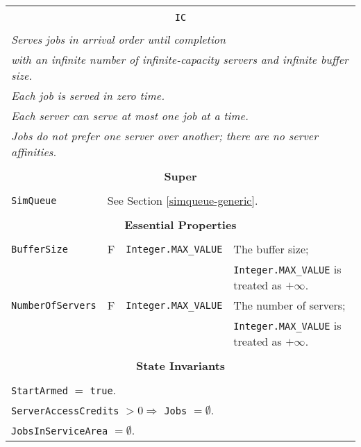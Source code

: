 \documentclass[12pt]{book}
\begin{document}
\begin{tabular}{|l|l|l|l|}
\hline
\multicolumn{4}{|c|}{} \\
\multicolumn{4}{|c|}{\lstinline[basicstyle=\large]{IC}} \\
\multicolumn{4}{|c|}{} \\
\hline
\multicolumn{4}{|l|}{\em Serves jobs in arrival order until completion} \\
\multicolumn{4}{|l|}{\em with an infinite number of infinite-capacity servers and infinite buffer size.} \\
\multicolumn{4}{|l|}{\em Each job is served in zero time.} \\
\multicolumn{4}{|l|}{\em Each server can serve at most one job at a time.} \\
\multicolumn{4}{|l|}{\em Jobs do not prefer one server over another; there are no server affinities.} \\
\hline
\multicolumn{4}{|c|}{} \\
\multicolumn{4}{|c|}{\bf Super} \\
\multicolumn{4}{|c|}{} \\
\hline
\lstinline|SimQueue| & \multicolumn{3}{|l|}{See Section \ref{simqueue-generic}.} \\
\hline
\multicolumn{4}{|c|}{} \\
\multicolumn{4}{|c|}{\bf Essential Properties} \\
\multicolumn{4}{|c|}{} \\
\hline
\lstinline|BufferSize|      & F & \lstinline|Integer.MAX_VALUE|
                            & The buffer size; \\
                        & & & \lstinline|Integer.MAX_VALUE| is treated as $+\infty$. \\
\hline
\lstinline|NumberOfServers| & F & \lstinline|Integer.MAX_VALUE|
                            & The number of servers; \\
                        & & & \lstinline|Integer.MAX_VALUE| is treated as $+\infty$. \\
\hline
\multicolumn{4}{|c|}{} \\
\multicolumn{4}{|c|}{\bf State  Invariants} \\
\multicolumn{4}{|c|}{} \\
\hline
\multicolumn{4}{|l|}{\lstinline|StartArmed| $=$ \lstinline|true|.} \\
\multicolumn{4}{|l|}{\lstinline|ServerAccessCredits| $> 0 \Rightarrow$ \lstinline|Jobs| $= \emptyset$.} \\
\multicolumn{4}{|l|}{\lstinline|JobsInServiceArea| $= \emptyset$.} \\

\end{tabular}
\end{document}
